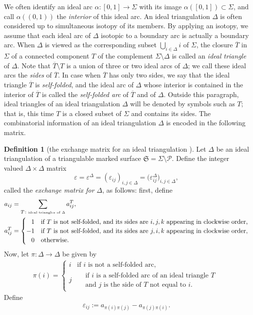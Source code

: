 \documentclass[10pt,a4paper]{amsart}
\numberwithin{equation}{section}
\theoremstyle{definition}
\newtheorem{Definition}[Theorem]{Definition}
\newcommand{\ol}[1]{\overline{#1}}
\begin{document}
We often identify an ideal arc $\alpha \colon [0,1]\to\Sigma$ with its image $\alpha([0,1]) \subset \Sigma$, and call $\alpha((0,1))$ the {\em interior} of this ideal arc. An ideal triangulation $\Delta$ is often considered up to simultaneous isotopy of its members. By applying an isotopy, we assume that each ideal arc of $\Delta$ isotopic to a boundary arc is actually a boundary arc. When $\Delta$ is viewed as the corresponding subset $\bigcup_{i \in \Delta} i$ of $\Sigma$, the closure $\ol{T}$ in $\Sigma$ of a connected component $T$ of the complement $\Sigma \setminus \Delta$ is called an {\em ideal triangle} of $\Delta$. Note that $\ol{T} \setminus T$ is a union of three or two ideal arcs of $\Delta$; we call these ideal arcs the {\em sides} of $\ol{T}$. In case when $\ol{T}$ has only two sides, we say that the ideal triangle $\ol{T}$ is {\em self-folded}, and the ideal arc of $\Delta$ whose interior is contained in the interior of $\ol{T}$ is called the {\em self-folded arc} of $\ol{T}$ and of $\Delta$. Outside this paragraph, ideal triangles of an ideal triangulation $\Delta$ will be denoted by symbols such as $T$; that is, this time $T$ is a closed subset of $\Sigma$ and contains its sides. The combinatorial information of an ideal triangulation $\Delta$ is encoded in the following matrix.
\begin{Definition}[the exchange matrix for an ideal triangulation \cite{FST}]
\label{def:varepsilon_Delta}
Let $\Delta$ be an ideal triangulation of a triangulable marked surface $\mathfrak{S} = \Sigma \setminus \mathcal{P}$. Define the integer valued $\Delta\times \Delta$ matrix
\[
\varepsilon = \varepsilon^\Delta = (\varepsilon_{ij})_{i,j\in \Delta} = \bigl(\varepsilon^\Delta_{ij}\bigr)_{i,j\in \Delta},
\]
called the {\em exchange matrix for $\Delta$}, as follows: first, define
\begin{align*}
a_{ij} & = \sum_{T\colon \mbox{\tiny ideal triangles of $\Delta$}} a^T_{ij}, \\
a^T_{ij} & = \begin{cases}
 \hphantom{-}1 & \mbox{if $T$ is not self-folded, and its sides are $i,j,k$ appearing in clockwise order,} \\
 -1 & \mbox{if $T$ is not self-folded, and its sides are $j,i,k$ appearing in clockwise order,} \\
 \hphantom{-}0 & \mbox{otherwise}.
 \end{cases}
\end{align*}
Now, let $\pi \colon \Delta \to \Delta$ be given by
\begin{align}
\label{eq:pi}
\pi(i) = \begin{cases}
 i & \mbox{if $i$ is not a self-folded arc}, \\
 j & \begin{aligned} & \text{if $i$ is a self-folded arc of an ideal triangle $T$} \\
 & \text{and $j$ is the side of $T$ not equal to $i$}.\end{aligned}
 \end{cases}
\end{align}
Define
\begin{align*}
\varepsilon_{ij} := a_{\pi(i) \pi(j)} - a_{\pi(j) \pi(i)}.
\end{align*}
\end{Definition}
\end{document}
